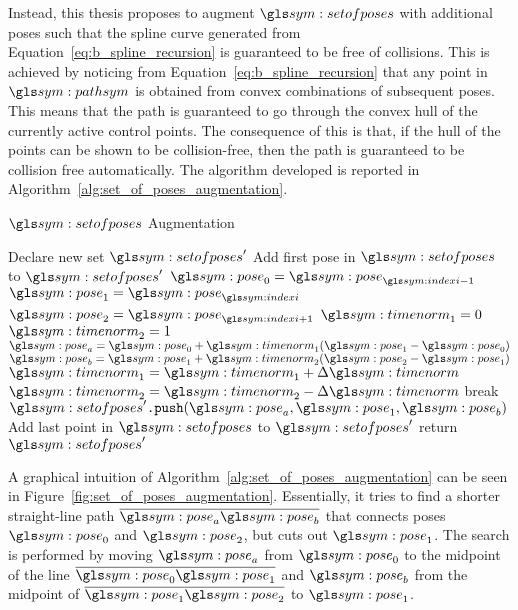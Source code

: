 		Instead, this thesis proposes to augment $\setofposes$ with additional
		poses such that the spline curve generated from
		Equation~\ref{eq:b_spline_recursion} is guaranteed to be free of
		collisions. This is achieved by noticing from
		Equation~\ref{eq:b_spline_recursion} that any point in $\pathsym$ is
		obtained from convex combinations of subsequent poses. This means that
		the path is guaranteed to go through the convex hull of the currently
		active control points. The consequence of this is that, if the hull of
		the points can be shown to be collision-free, then the path is
		guaranteed to be collision free automatically. The algorithm developed
		is reported in Algorithm~\ref{alg:set_of_poses_augmentation}.

		\begin{algorithm}[ht]
			\caption{$\setofposes$ Augmentation}%
			\label{alg:set_of_poses_augmentation}
			\begin{algorithmic}[1]
					\State{}Declare new set $\setofposes'$
					\State{}Add first pose in $\setofposes$ to $\setofposes'$
					\ForAll{$\pose_{\indexi} \in \setofposes$}
						\State{}$\pose_0 = \pose_{\indexi - 1}$
						\State{}$\pose_1 = \pose_{\indexi}$
						\State{}$\pose_2 = \pose_{\indexi + 1}$
						\State{}$\timenorm_1 = 0$
						\State{}$\timenorm_2 = 1$
							\State{}$\pose_a = \pose_0 + \timenorm_1(\pose_1 -
								\pose_0)$
							\State{}$\pose_b = \pose_1 + \timenorm_2(\pose_2 -
								\pose_1)$
							\State{}$\timenorm_1 = \timenorm_1 + \Delta\timenorm$
							\State{}$\timenorm_2 = \timenorm_2 - \Delta\timenorm$
								\State{}break
							\EndIf{}
						\EndWhile
						\State{}$\setofposes'\code{.push}(\pose_a, \pose_1, \pose_b)$
					\EndFor{}
					\State{}Add last point in $\setofposes$ to $\setofposes'$
					\State{}return $\setofposes'$
				\EndProcedure
			\end{algorithmic}
		\end{algorithm}

		A graphical intuition of Algorithm~\ref{alg:set_of_poses_augmentation}
		can be seen in Figure~\ref{fig:set_of_poses_augmentation}. Essentially,
		it tries to find a shorter straight-line path
		$\vecline{\pose_a}{\pose_b}$ that connects poses $\pose_0$ and
		$\pose_2$, but cuts out $\pose_1$. The search is performed by moving
		$\pose_a$ from $\pose_0$ to the midpoint of the line
		$\vecline{\pose_0}{\pose_1}$ and $\pose_b$ from the midpoint of
		$\vecline{\pose_1}{\pose_2}$ to $\pose_1$.


